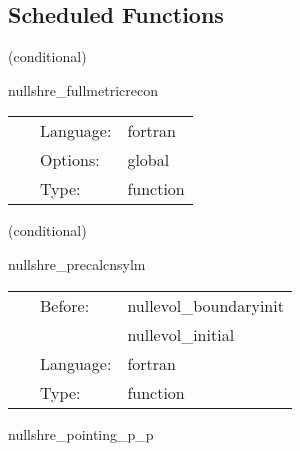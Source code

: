 \subsection*{Scheduled Functions}
\vspace{5mm}

   (conditional) 

\hspace{5mm} nullshre\_fullmetricrecon 

\hspace{5mm}{\it current extraction of full metric and its derivatives on the sphere } 


\hspace{5mm}

 \begin{tabular*}{160mm}{cll} 
~ & Language:  & fortran \\ 
~ & Options:  & global \\ 
~ & Type:  & function \\ 
\end{tabular*} 


\vspace{5mm}

   (conditional) 

\hspace{5mm} nullshre\_precalcnsylm 

\hspace{5mm}{\it precalculate spherical harmonics in (p,q) coordinates } 


\hspace{5mm}

 \begin{tabular*}{160mm}{cll} 
~ & Before:  & nullevol\_boundaryinit \\ 
~& ~ &nullevol\_initial\\ 
~ & Language:  & fortran \\ 
~ & Type:  & function \\ 
\end{tabular*} 


\vspace{5mm}


\hspace{5mm} nullshre\_pointing\_p\_p 

\hspace{5mm}{\it target p-p level variables for the pointers used in initialization } 


